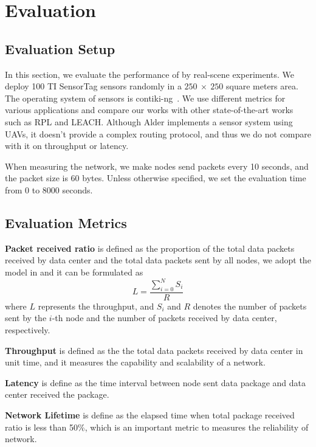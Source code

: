 \section{Evaluation}
\label{Eva}

\subsection{Evaluation Setup} In this section, we evaluate the performance of {\sdn}
by real-scene experiments. We deploy 100 TI
SensorTag sensors randomly in a $250~\times~250$ square meters area. 
The operating system of sensors is contiki-ng~\cite{}. We use different metrics for various
applications and compare our works with other state-of-the-art works such as RPL
and LEACH. Although Alder implements a sensor system using UAVs, it doesn't
provide a complex routing protocol, and thus we do not compare with it on
throughput or latency.

When measuring the network, we make nodes send packets every 10 seconds, and the
packet size is 60 bytes. Unless otherwise specified, we set the evaluation time
from 0 to 8000 seconds.

\subsection{Evaluation Metrics}

\textbf{Packet received ratio} is defined as the proportion of the total data
packets received by data center and the total data packets sent by all nodes, 
we adopt the model in \cite{chen2017energy}
and it can be formulated as
\begin{equation}
	L = \frac{\sum_{i = 0}^{N}S_i}{R}
\end{equation}
where $L$ represents the throughput, and $S_i$ and $R$ denotes the number of
packets sent by the $i$-th node and the number of packets received by data
center, respectively.

\textbf{Throughput} is defined as the the total data packets received by data
center in unit time, and it measures the capability and scalability of a network.

\textbf{Latency} is define as the time interval between node sent data package and
data center received the package.

\textbf{Network Lifetime} is define as the elapsed time when total package
received ratio is less than 50\%, which is an important metric to measures the
reliability of network.

